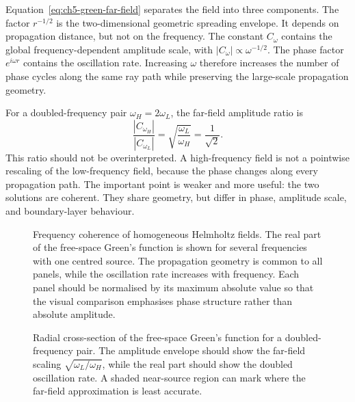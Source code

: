 Equation~\eqref{eq:ch5-green-far-field} separates the field into three
components. The factor $r^{-1/2}$ is the two-dimensional geometric spreading
envelope. It depends on propagation distance, but not on the frequency. The
constant $C_\omega$ contains the global frequency-dependent amplitude scale,
with $|C_\omega|\propto\omega^{-1/2}$. The phase factor $e^{i\omega r}$
contains the oscillation rate. Increasing $\omega$ therefore increases the
number of phase cycles along the same ray path while preserving the large-scale
propagation geometry.

For a doubled-frequency pair $\omega_H=2\omega_L$, the far-field amplitude
ratio is
\begin{equation}
    \frac{|C_{\omega_H}|}{|C_{\omega_L}|}
    =
    \sqrt{\frac{\omega_L}{\omega_H}}
    =
    \frac{1}{\sqrt{2}}.
    \label{eq:ch5-amplitude-ratio}
\end{equation}
This ratio should not be overinterpreted. A high-frequency field is not a
pointwise rescaling of the low-frequency field, because the phase changes
along every propagation path. The important point is weaker and more useful:
the two solutions are coherent. They share geometry, but differ in phase,
amplitude scale, and boundary-layer behaviour.

\begin{figure}[htbp]
    \centering
    \caption{Frequency coherence of homogeneous Helmholtz fields. The real
    part of the free-space Green's function is shown for several frequencies
    with one centred source. The propagation geometry is common to all panels,
    while the oscillation rate increases with frequency. Each panel should be
    normalised by its maximum absolute value so that the visual comparison
    emphasises phase structure rather than absolute amplitude.}
    \label{fig:ch5-green-frequency-coherence}
\end{figure}

\begin{figure}[htbp]
    \centering
    \caption{Radial cross-section of the free-space Green's function for a
    doubled-frequency pair. The amplitude envelope should show the far-field
    scaling $\sqrt{\omega_L/\omega_H}$, while the real part should show the
    doubled oscillation rate. A shaded near-source region can mark where the
    far-field approximation is least accurate.}
    \label{fig:ch5-radial-green-cross-section}
\end{figure}

